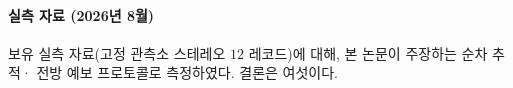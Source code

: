 \documentclass[11pt]{report}
\numberwithin{equation}{chapter}
\numberwithin{figure}{chapter}
\numberwithin{table}{chapter}
\begin{document}
\paragraph{실측 자료 (2026년 8월)}
보유 실측 자료(고정 관측소 스테레오 $12$ 레코드)에 대해, 본 논문이 주장하는 순차 추적·
전방 예보 프로토콜로 측정하였다.
결론은 여섯이다.
\end{document}
